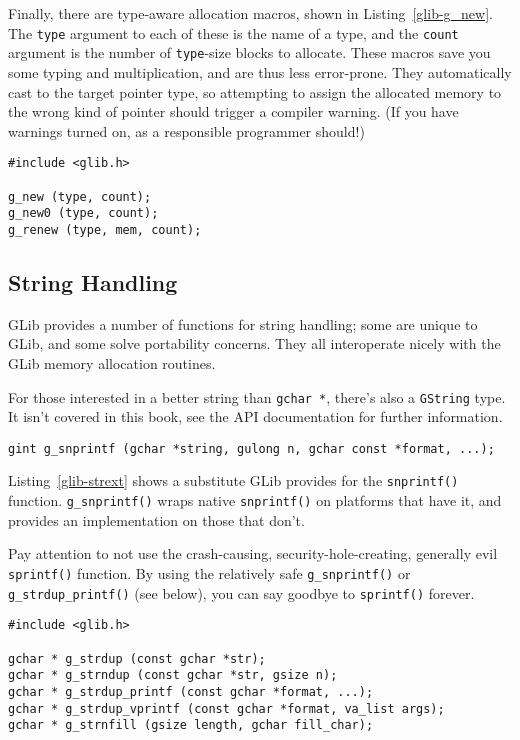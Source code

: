 Finally, there are type-aware allocation macros, shown in Listing~\ref{glib-g_new}. The \lstinline{type} argument to each of these is the name of a type, and the \lstinline{count} argument is the number of \lstinline{type}-size blocks to allocate. These macros save you some typing and multiplication, and are thus less error-prone. They automatically cast to the target pointer type, so attempting to assign the allocated memory to the wrong kind of pointer should trigger a compiler warning. (If you have warnings turned on, as a responsible programmer should!)

\begin{lstlisting}[float, caption={Allocation macros}, label=glib-g_new]
#include <glib.h>

g_new (type, count);
g_new0 (type, count);
g_renew (type, mem, count);
\end{lstlisting}

\subsection{String Handling}

GLib provides a number of functions for string handling; some are unique to GLib, and some solve portability concerns. They all interoperate nicely with the GLib memory allocation routines.

For those interested in a better string than \lstinline{gchar *}, there's also a \lstinline{GString} type. It isn't covered in this book, see the API documentation for further information.

\begin{lstlisting}[float, caption={Portability Wrapper}, label=glib-strext]
gint g_snprintf (gchar *string, gulong n, gchar const *format, ...);
\end{lstlisting}

Listing~\ref{glib-strext} shows a substitute GLib provides for the \lstinline{snprintf()} function. \lstinline{g_snprintf()} wraps native \lstinline{snprintf()} on platforms that have it, and provides an implementation on those that don't.

Pay attention to not use the crash-causing, security-hole-creating, generally evil \lstinline{sprintf()} function. By using the relatively safe \lstinline{g_snprintf()} or \lstinline{g_strdup_printf()} (see below), you can say goodbye to \lstinline{sprintf()} forever.

\begin{lstlisting}[float, caption={Allocating Strings}, label=glib-strdup]
#include <glib.h>

gchar * g_strdup (const gchar *str);
gchar * g_strndup (const gchar *str, gsize n);
gchar * g_strdup_printf (const gchar *format, ...);
gchar * g_strdup_vprintf (const gchar *format, va_list args);
gchar * g_strnfill (gsize length, gchar fill_char);
\end{lstlisting}

